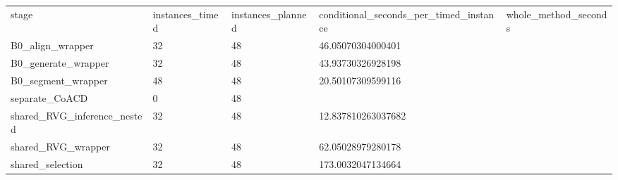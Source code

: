 \begin{tabular}{lllll}
stage & instances\_timed & instances\_planned & conditional\_seconds\_per\_timed\_instance & whole\_method\_seconds \\
B0\_align\_wrapper & 32 & 48 & 46.05070304000401 &  \\
B0\_generate\_wrapper & 32 & 48 & 43.93730326928198 &  \\
B0\_segment\_wrapper & 48 & 48 & 20.50107309599116 &  \\
separate\_CoACD & 0 & 48 &  &  \\
shared\_RVG\_inference\_nested & 32 & 48 & 12.837810263037682 &  \\
shared\_RVG\_wrapper & 32 & 48 & 62.05028979280178 &  \\
shared\_selection & 32 & 48 & 173.0032047134664 &  \\
\end{tabular}
